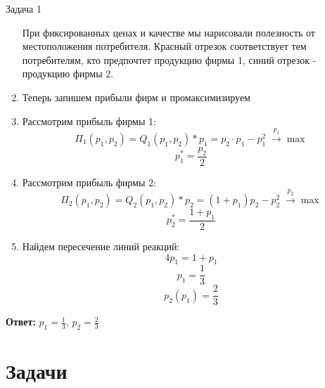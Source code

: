 \begin{mybox}{Задача 1}
\begin{enumerate}
\begin{center}
        \end{center}
        При фиксированных ценах и качестве мы нарисовали полезность от местоположения потребителя. Красный отрезок
        соответствует тем потребителям, кто предпочтет продукцию фирмы 1, синий отрезок - продукцию фирмы 2.
        \item Теперь запишем прибыли фирм и промаксимизируем
        \item Рассмотрим прибыль фирмы 1:
        $$\Pi_1(p_1,p_2)=Q_1(p_1,p_2)*p_1=p_2\cdot p_1-p_1^2\;\xrightarrow{p_1} \max$$
        $$p_1^*=\frac{p_2}{2}$$
        \item Рассмотрим прибыль фирмы 2:
        $$\Pi_2(p_1,p_2)=Q_2(p_1,p_2)*p_2=(1+p_1)p_2-p_2^2\;\xrightarrow{p_2} \max$$
        $$p_2^*=\frac{1+p_1}{2}$$
        \item Найдем пересечение линий реакций:
        $$4p_1=1+p_1$$
        $$p_1=\frac{1}{3}$$
        $$p_2(p_1)=\frac{2}{3}$$
    \end{enumerate}
    \textbf{Ответ:} $p_1=\frac{1}{3}$, $p_2=\frac{2}{3}$
\end{mybox}


\section{Задачи}

